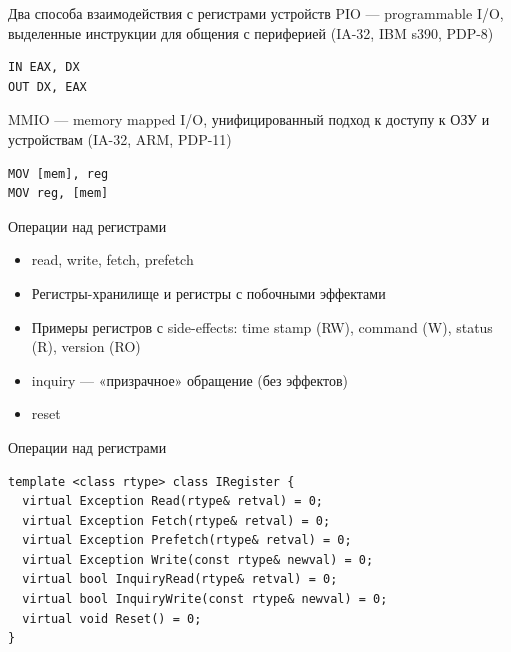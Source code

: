 \documentclass{beamer}
\begin{document}
\begin{frame}[fragile]{Два способа взаимодействия с регистрами устройств}
PIO — programmable I/O, выделенные инструкции для общения с периферией (IA-32, IBM s390, PDP-8)

\begin{verbatim}
IN EAX, DX
OUT DX, EAX
\end{verbatim}
\pause

MMIO — memory mapped I/O, унифицированный подход к доступу к ОЗУ и устройствам (IA-32, ARM, PDP-11)

\begin{verbatim}
MOV [mem], reg
MOV reg, [mem]
\end{verbatim}

\end{frame}

\begin{frame}{Операции над регистрами}
\begin{itemize}
\item read, write, fetch, prefetch
\item Регистры-хранилище и регистры с побочными эффектами
\item Примеры регистров с side-effects: time stamp (RW), command (W), status (R), version (RO)
\item inquiry — «призрачное» обращение (без эффектов)
\item reset
\end{itemize}

\end{frame}

\begin{frame}[fragile]{Операции над регистрами}
\begin{verbatim}
template <class rtype> class IRegister {
  virtual Exception Read(rtype& retval) = 0;
  virtual Exception Fetch(rtype& retval) = 0;
  virtual Exception Prefetch(rtype& retval) = 0;
  virtual Exception Write(const rtype& newval) = 0;
  virtual bool InquiryRead(rtype& retval) = 0;
  virtual bool InquiryWrite(const rtype& newval) = 0;
  virtual void Reset() = 0;
}
\end{verbatim}
\end{frame}
\end{document}
